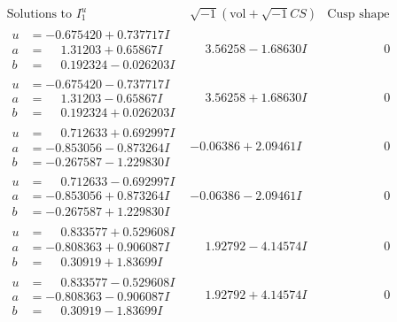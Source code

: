 \documentclass[1p]{elsarticle_modified}
\theoremstyle{definition}
\newcommand{\I}{\sqrt{-1}}
\begin{document}
$$\begin{array}{c|c|c}  
\text{Solutions to }I^u_{1}& \I (\text{vol} + \sqrt{-1}CS) & \text{Cusp shape}\\
 \hline 
\begin{aligned}
u &= -0.675420 + 0.737717 I \\
a &= \phantom{-}1.31203 + 0.65867 I \\
b &= \phantom{-}0.192324 - 0.026203 I\end{aligned}
 & \phantom{-}3.56258 - 1.68630 I & \phantom{-0.000000 } 0 \\ \hline\begin{aligned}
u &= -0.675420 - 0.737717 I \\
a &= \phantom{-}1.31203 - 0.65867 I \\
b &= \phantom{-}0.192324 + 0.026203 I\end{aligned}
 & \phantom{-}3.56258 + 1.68630 I & \phantom{-0.000000 } 0 \\ \hline\begin{aligned}
u &= \phantom{-}0.712633 + 0.692997 I \\
a &= -0.853056 - 0.873264 I \\
b &= -0.267587 - 1.229830 I\end{aligned}
 & -0.06386 + 2.09461 I & \phantom{-0.000000 } 0 \\ \hline\begin{aligned}
u &= \phantom{-}0.712633 - 0.692997 I \\
a &= -0.853056 + 0.873264 I \\
b &= -0.267587 + 1.229830 I\end{aligned}
 & -0.06386 - 2.09461 I & \phantom{-0.000000 } 0 \\ \hline\begin{aligned}
u &= \phantom{-}0.833577 + 0.529608 I \\
a &= -0.808363 + 0.906087 I \\
b &= \phantom{-}0.30919 + 1.83699 I\end{aligned}
 & \phantom{-}1.92792 - 4.14574 I & \phantom{-0.000000 } 0 \\ \hline\begin{aligned}
u &= \phantom{-}0.833577 - 0.529608 I \\
a &= -0.808363 - 0.906087 I \\
b &= \phantom{-}0.30919 - 1.83699 I\end{aligned}
 & \phantom{-}1.92792 + 4.14574 I & \phantom{-0.000000 } 0 \\ \hline\begin{aligned}

\end{aligned}
\end{array}$$
\end{document}
